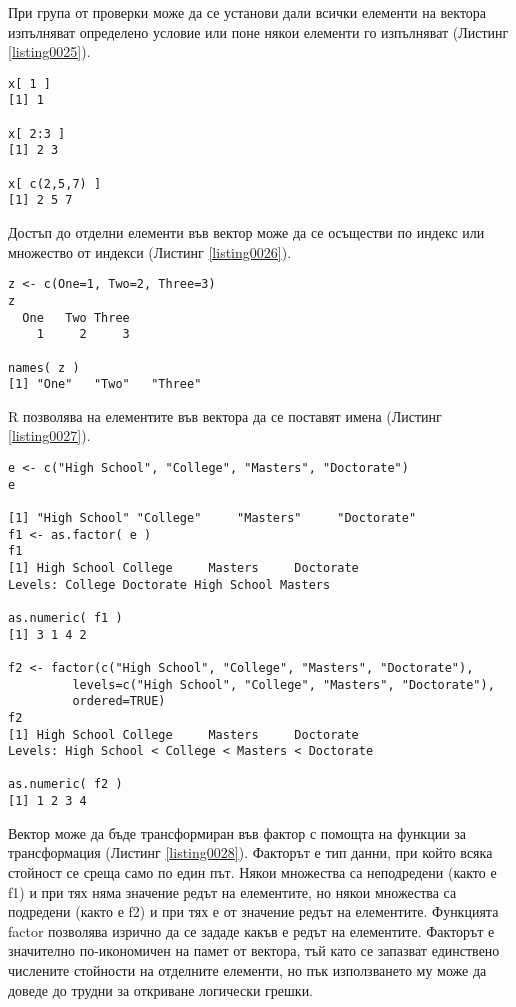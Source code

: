 При група от проверки може да се установи дали всички елементи на вектора изпълняват определено условие или поне някои елементи го изпълняват (Листинг \ref{listing0025}).

\begin{lstlisting}[caption=Достъп до отделни елементи във вектор, label=listing0026]
x[ 1 ]
[1] 1

x[ 2:3 ]
[1] 2 3

x[ c(2,5,7) ]
[1] 2 5 7
\end{lstlisting}

Достъп до отделни елементи във вектор може да се осъществи по индекс или множество от индекси (Листинг \ref{listing0026}).

\begin{lstlisting}[caption=Имена на елементите във вектора, label=listing0027]
z <- c(One=1, Two=2, Three=3)
z
  One   Two Three 
    1     2     3 

names( z )
[1] "One"   "Two"   "Three"
\end{lstlisting}

R позволява на елементите във вектора да се поставят имена (Листинг \ref{listing0027}).

\begin{lstlisting}[caption=Трансформация на вектор във фактор, label=listing0028]
e <- c("High School", "College", "Masters", "Doctorate")
e

[1] "High School" "College"     "Masters"     "Doctorate"  
f1 <- as.factor( e )
f1
[1] High School College     Masters     Doctorate  
Levels: College Doctorate High School Masters

as.numeric( f1 )
[1] 3 1 4 2

f2 <- factor(c("High School", "College", "Masters", "Doctorate"), 
		 levels=c("High School", "College", "Masters", "Doctorate"),
		 ordered=TRUE)
f2
[1] High School College     Masters     Doctorate  
Levels: High School < College < Masters < Doctorate

as.numeric( f2 )
[1] 1 2 3 4
\end{lstlisting}

Вектор може да бъде трансформиран във фактор с помощта на функции за трансформация (Листинг \ref{listing0028}). Факторът е тип данни, при който всяка стойност се среща само по един път. Някои множества са неподредени (както е f1) и при тях няма значение редът на елементите, но някои множества са подредени (както е f2) и при тях е от значение редът на елементите. Функцията factor позволява изрично да се зададе какъв е редът на елементите. Факторът е значително по-икономичен на памет от вектора, тъй като се запазват единствено числените стойности на отделните елементи, но пък използването му може да доведе до трудни за откриване логически грешки.


